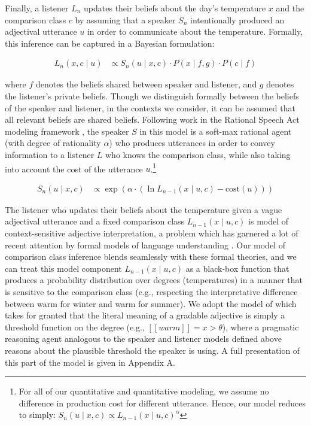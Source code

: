 \documentclass[doc]{apa6}
\begin{document}
Finally, a listener $L_n$ updates their beliefs about the day's temperature $x$ and the comparison class $c$ by assuming that a speaker $S_n$ intentionally produced an adjectival utterance $u$ in order to communicate about the temperature.
Formally, this inference can be captured in a Bayesian formulation:

\begin{align}
L_n(x, c \mid u) &\propto S_n(u \mid x, c) \cdot P(x \mid f, g) \cdot P(c \mid f) \label{eq:L2} 
\end{align}

\noindent where $f$ denotes the beliefs shared between speaker and listener, and $g$ denotes the listener's private beliefs. 
Though we distinguish formally between the beliefs of the speaker and listener, in the contexts we consider, it can be assumed that all relevant beliefs are shared beliefs.
Following work in the Rational Speech Act modeling framework \cite{Frank2012, Goodman2016, scontras2017probabilistic}, the speaker $S$ in this model is a soft-max rational agent (with degree of rationality $\alpha$) who produces utterances in order to convey information to a listener $L$ who knows the comparison class, while also taking into account the cost of the utterance $u$.\footnote{For all of our quantitative and quantitative modeling, we assume no difference in production cost for different utterance. Hence, our model reduces to simply: $S_n(u \mid x, c) \propto L_{n-1}(x \mid u, c)^{ \alpha}$}

\begin{align}
S_n(u \mid x, c) &\propto \exp{(\alpha \cdot (\ln L_{n-1}(x \mid u, c) - \text{cost}(u) ))}\label{eq:S2} 
\end{align}

The listener who updates their beliefs about the temperature given a vague adjectival utterance and a fixed comparison class $L_{n-1}(x \mid u, c)$ is model of context-sensitive adjective interpretation, a problem which has garnered a lot of recent attention by formal models of language understanding \cite{Lassiter2013, Qing2014a, Lassiter2017}.
Our model of comparison class inference blends seamlessly with these formal theories, and we can treat this model component $L_{n-1}(x \mid u, c)$ as a black-box function that produces a probability distribution over degrees (temperatures) in a manner that is sensitive to the comparison class (e.g., respecting the interpretative difference between warm for winter and warm for summer). 
We adopt the model of  which takes for granted  that the literal meaning of a gradable adjective is simply a threshold function on the degree (e.g., \([\![warm]\!] = x > \theta\)), where a pragmatic reasoning agent analogous to the speaker and listener models defined above reasons about the plausible threshold the speaker is using. A full presentation of this  part of the model is given in Appendix A.
\end{document}
